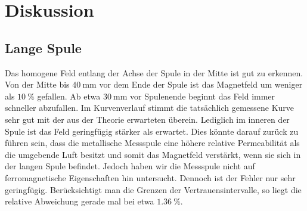 \section{Diskussion}
\subsection{Lange Spule}
Das homogene Feld entlang der Achse der Spule in der Mitte ist gut zu erkennen. Von der Mitte bis $ \SI{40}{\milli\meter} $ vor dem Ende der Spule ist das Magnetfeld um weniger als $ \SI{10}{\percent} $ gefallen. Ab etwa $ \SI{30}{\milli\meter} $ vor Spulenende beginnt das Feld immer schneller abzufallen. Im Kurvenverlauf stimmt die tatsächlich gemessene Kurve sehr gut mit der aus der Theorie erwarteten überein. Lediglich im inneren der Spule ist das Feld geringfügig stärker als erwartet. Dies könnte darauf zurück zu führen sein, dass die metallische Messspule eine höhere relative Permeabilität als die umgebende Luft besitzt und somit das Magnetfeld verstärkt, wenn sie sich in der langen Spule befindet. Jedoch haben wir die Messspule nicht auf ferromagnetische Eigenschaften hin untersucht. Dennoch ist der Fehler nur sehr geringfügig. Berücksichtigt man die Grenzen der Vertrauensintervalle, so liegt die relative Abweichung gerade mal bei etwa $ \SI{1.36}{\percent} $.

